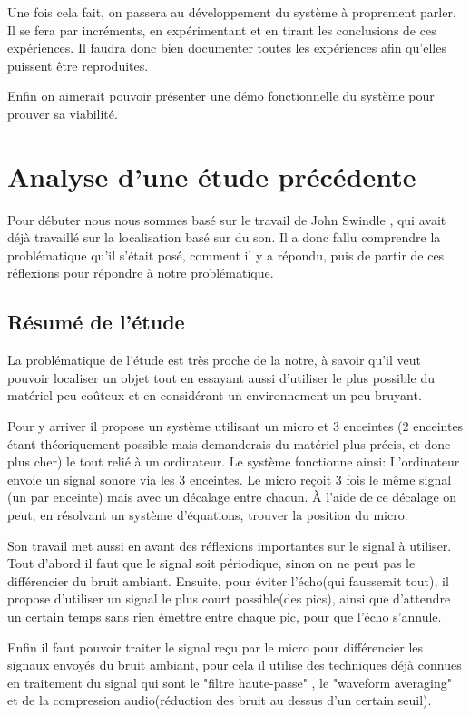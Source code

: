 \documentclass[12pt,a4paper]{report}
\begin{document}
Une fois cela fait, on passera au développement du système à proprement parler. Il se fera par incréments, en expérimentant et en tirant les conclusions de ces expériences. Il faudra donc bien documenter toutes les expériences afin qu'elles puissent être reproduites.

Enfin on aimerait pouvoir présenter une démo fonctionnelle du système pour prouver sa viabilité.

\chapter{Analyse d'une étude précédente}

Pour débuter nous nous sommes basé sur le travail de John Swindle \cite{john_swindle2010}, qui avait déjà travaillé sur la localisation basé sur du son. Il a donc fallu comprendre la problématique qu'il s'était posé, comment il y a répondu, puis de partir de ces réflexions pour répondre à notre problématique.

\section{Résumé de l'étude}
La problématique de l'étude est très proche de la notre, à savoir qu'il veut pouvoir localiser un objet tout en essayant aussi d'utiliser le plus possible du matériel peu coûteux et en considérant un environnement un peu bruyant.

Pour y arriver il propose un système utilisant un micro et 3 enceintes (2 enceintes étant théoriquement possible mais demanderais du matériel plus précis, et donc plus cher) le tout relié à un ordinateur.
Le système fonctionne ainsi: L'ordinateur envoie un signal sonore via les 3 enceintes. Le micro reçoit 3 fois le même signal (un par enceinte) mais avec un décalage entre chacun. À l'aide de ce décalage on peut, en résolvant un système d'équations, trouver la position du micro.

Son travail met aussi en avant des réflexions importantes sur le signal à utiliser. Tout d'abord il faut que le signal soit périodique, sinon on ne peut pas le différencier du bruit ambiant. Ensuite, pour éviter l'écho(qui fausserait tout), il propose d'utiliser un signal le plus court possible(des pics), ainsi que d'attendre un certain temps sans rien émettre entre chaque pic, pour que l'écho s'annule.

Enfin il faut pouvoir traiter le signal reçu par le micro pour différencier les signaux envoyés du bruit ambiant, pour cela il utilise des techniques déjà connues en traitement du signal qui sont le "filtre haute-passe" , le "waveform averaging" et de la compression audio(réduction des bruit au dessus d'un certain seuil).
\end{document}
